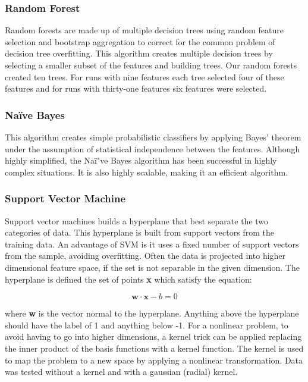 \documentclass[aps, reprint, amsmath, amssymb]{revtex4-1}
\begin{document}
\subsubsection{Random Forest}
Random forests are made up of multiple decision trees using random feature selection and bootstrap aggregation to correct for the common problem of decision tree overfitting.  This algorithm creates multiple decision trees by selecting a smaller subset of the features and building trees. Our random forests created ten trees.  For runs with nine features each tree selected four of these features and for runs with thirty-one features six features were selected.

\subsubsection{Na{\"i}ve Bayes}
This algorithm creates simple probabilistic classifiers by applying Bayes' theorem under the assumption of statistical independence between the features.  Although highly simplified, the Na{\"i"}ve Bayes algorithm has been successful in highly complex situations.  It is also highly scalable, making it an efficient algorithm.  

\subsubsection{Support Vector Machine}
Support vector machines builds a hyperplane that best separate the two categories of data. This hyperplane is built from support vectors from the training data.  An advantage of SVM is it uses a fixed number of support vectors from the sample, avoiding overfitting.  Often the data is projected into higher dimensional feature space, if the set is not separable in the given dimension.  The hyperplane is defined the set of points \textbf{x} which satisfy the equation:

\begin{equation}
\mathbf{w} \cdot \mathbf{x} - b = 0
\end{equation}

where \textbf{w} is the vector normal to the hyperplane.  Anything above the hyperplane should have the label of 1 and anything below -1.  For a nonlinear problem, to avoid having to go into higher dimensions, a kernel trick can be applied replacing the inner product of the basis functions with a kernel function. The kernel is used to map the problem to a new space by applying a nonlinear transformation.  Data was tested without a kernel and with a gaussian (radial) kernel.
\end{document}
